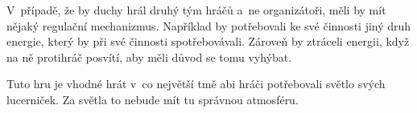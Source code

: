 V~případě, že by duchy hrál druhý tým hráčů a~ne organizátoři, měli by mít nějaký regulační mechanizmus.
Například by potřebovali ke své činnosti jiný druh energie, který by při své činnosti spotřebovávali.
Zároveň by ztráceli energii, když na ně protihráč posvítí, aby měli důvod se tomu vyhýbat.

Tuto hru je vhodné hrát v~co největší tmě abi hráči potřebovali světlo svých lucerniček.
Za světla to nebude mít tu správnou atmosféru.
